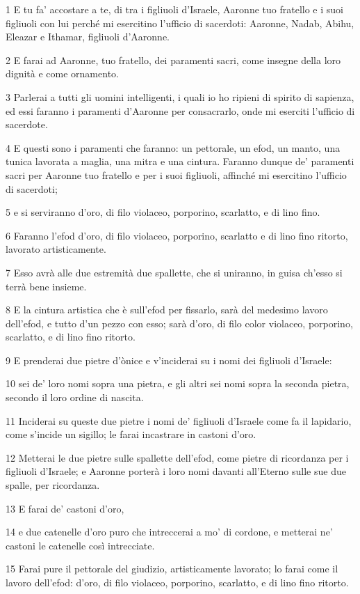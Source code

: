 \par 1 E tu fa' accostare a te, di tra i figliuoli d'Israele, Aaronne tuo fratello e i suoi figliuoli con lui perché mi esercitino l'ufficio di sacerdoti: Aaronne, Nadab, Abihu, Eleazar e Ithamar, figliuoli d'Aaronne.
\par 2 E farai ad Aaronne, tuo fratello, dei paramenti sacri, come insegne della loro dignità e come ornamento.
\par 3 Parlerai a tutti gli uomini intelligenti, i quali io ho ripieni di spirito di sapienza, ed essi faranno i paramenti d'Aaronne per consacrarlo, onde mi eserciti l'ufficio di sacerdote.
\par 4 E questi sono i paramenti che faranno: un pettorale, un efod, un manto, una tunica lavorata a maglia, una mitra e una cintura. Faranno dunque de' paramenti sacri per Aaronne tuo fratello e per i suoi figliuoli, affinché mi esercitino l'ufficio di sacerdoti;
\par 5 e si serviranno d'oro, di filo violaceo, porporino, scarlatto, e di lino fino.
\par 6 Faranno l'efod d'oro, di filo violaceo, porporino, scarlatto e di lino fino ritorto, lavorato artisticamente.
\par 7 Esso avrà alle due estremità due spallette, che si uniranno, in guisa ch'esso si terrà bene insieme.
\par 8 E la cintura artistica che è sull'efod per fissarlo, sarà del medesimo lavoro dell'efod, e tutto d'un pezzo con esso; sarà d'oro, di filo color violaceo, porporino, scarlatto, e di lino fino ritorto.
\par 9 E prenderai due pietre d'ònice e v'inciderai su i nomi dei figliuoli d'Israele:
\par 10 sei de' loro nomi sopra una pietra, e gli altri sei nomi sopra la seconda pietra, secondo il loro ordine di nascita.
\par 11 Inciderai su queste due pietre i nomi de' figliuoli d'Israele come fa il lapidario, come s'incide un sigillo; le farai incastrare in castoni d'oro.
\par 12 Metterai le due pietre sulle spallette dell'efod, come pietre di ricordanza per i figliuoli d'Israele; e Aaronne porterà i loro nomi davanti all'Eterno sulle sue due spalle, per ricordanza.
\par 13 E farai de' castoni d'oro,
\par 14 e due catenelle d'oro puro che intreccerai a mo' di cordone, e metterai ne' castoni le catenelle così intrecciate.
\par 15 Farai pure il pettorale del giudizio, artisticamente lavorato; lo farai come il lavoro dell'efod: d'oro, di filo violaceo, porporino, scarlatto, e di lino fino ritorto.
